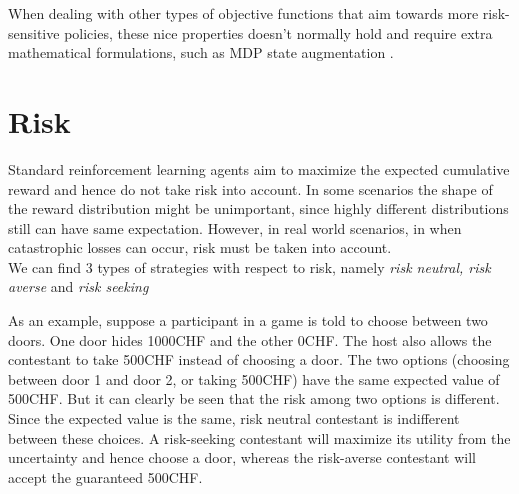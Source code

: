 When dealing with other types of objective functions that aim towards more risk-sensitive
policies, these nice properties doesn't normally hold
and require extra mathematical formulations, such as MDP state augmentation \citep{Chow2015}.



\section{Risk}
Standard reinforcement learning agents aim to maximize the expected cumulative reward and hence
do not take risk into account. In some scenarios the shape of the reward distribution might be unimportant,
since highly different distributions still can have same expectation. However, in real world scenarios, 
in  when catastrophic losses can occur, risk must be taken into account.\\
We can find 3 types of strategies with respect to risk, namely \textit{risk neutral, risk averse} and \textit{risk seeking}

As an example, suppose a participant in a game is told to choose between two doors.
One door hides 1000CHF and the other 0CHF. The host also allows the contestant to 
take 500CHF instead of choosing a door. The two options (choosing between door 1 and door 2, or taking 500CHF)
have the same expected value of 500CHF. But it can clearly be seen that the risk among two options is different.
Since the expected value is the same, risk neutral contestant is indifferent between these choices.
A risk-seeking contestant will maximize its utility from the uncertainty and hence choose a door,
whereas the risk-averse contestant  will accept the guaranteed 500CHF.

